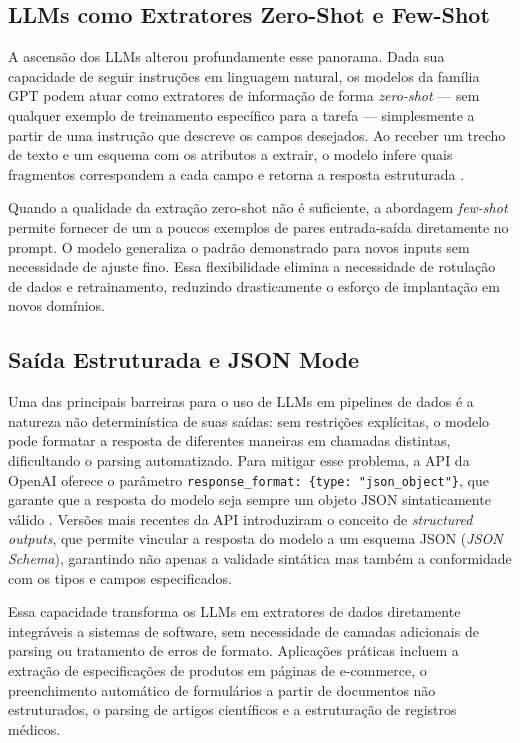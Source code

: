 \documentclass[tcc,capa]{texifsul}
\begin{document}
\subsection*{LLMs como Extratores Zero-Shot e Few-Shot}

A ascensão dos LLMs alterou profundamente esse panorama. Dada sua capacidade de seguir instruções em linguagem natural, os modelos da família GPT podem atuar como extratores de informação de forma \textit{zero-shot} — sem qualquer exemplo de treinamento específico para a tarefa — simplesmente a partir de uma instrução que descreve os campos desejados. Ao receber um trecho de texto e um esquema com os atributos a extrair, o modelo infere quais fragmentos correspondem a cada campo e retorna a resposta estruturada \cite{Brown2020}.

Quando a qualidade da extração zero-shot não é suficiente, a abordagem \textit{few-shot} permite fornecer de um a poucos exemplos de pares entrada-saída diretamente no prompt. O modelo generaliza o padrão demonstrado para novos inputs sem necessidade de ajuste fino. Essa flexibilidade elimina a necessidade de rotulação de dados e retrainamento, reduzindo drasticamente o esforço de implantação em novos domínios.

\subsection*{Saída Estruturada e JSON Mode}

Uma das principais barreiras para o uso de LLMs em pipelines de dados é a natureza não determinística de suas saídas: sem restrições explícitas, o modelo pode formatar a resposta de diferentes maneiras em chamadas distintas, dificultando o parsing automatizado. Para mitigar esse problema, a API da OpenAI oferece o parâmetro \texttt{response\_format: \{type: "json\_object"\}}, que garante que a resposta do modelo seja sempre um objeto JSON sintaticamente válido \cite{OpenAI2023}. Versões mais recentes da API introduziram o conceito de \textit{structured outputs}, que permite vincular a resposta do modelo a um esquema JSON (\textit{JSON Schema}), garantindo não apenas a validade sintática mas também a conformidade com os tipos e campos especificados.

Essa capacidade transforma os LLMs em extratores de dados diretamente integráveis a sistemas de software, sem necessidade de camadas adicionais de parsing ou tratamento de erros de formato. Aplicações práticas incluem a extração de especificações de produtos em páginas de e-commerce, o preenchimento automático de formulários a partir de documentos não estruturados, o parsing de artigos científicos e a estruturação de registros médicos.
\end{document}
